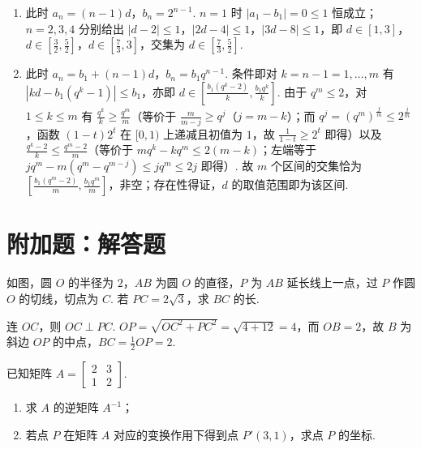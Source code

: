 \begin{solution}
\begin{enumerate}
\item 此时 \(a_n=(n-1)d\)，\(b_n=2^{n-1}\). \(n=1\) 时 \(|a_1-b_1|=0\leqslant1\) 恒成立；\(n=2,3,4\) 分别给出 \(|d-2|\leqslant1\)，\(|2d-4|\leqslant1\)，\(|3d-8|\leqslant1\)，即 \(d\in[1,3]\)，\(d\in\left[\frac32,\frac52\right]\)，\(d\in\left[\frac73,3\right]\)，交集为 \(d\in\left[\frac73,\frac52\right]\).
\item 此时 \(a_n=b_1+(n-1)d\)，\(b_n=b_1q^{n-1}\). 条件即对 \(k=n-1=1,\ldots,m\) 有 \(|kd-b_1(q^k-1)|\leqslant b_1\)，亦即 \(d\in\left[\frac{b_1(q^k-2)}{k},\frac{b_1q^k}{k}\right]\). 由于 \(q^m\leqslant2\)，对 \(1\leqslant k\leqslant m\) 有 \(\frac{q^k}{k}\geqslant\frac{q^m}{m}\)（等价于 \(\frac{m}{m-j}\geqslant q^j\)（\(j=m-k\)）；而 \(q^j=(q^m)^{\frac{j}{m}}\leqslant2^{\frac{j}{m}}\)，函数 \((1-t)2^t\) 在 \([0,1)\) 上递减且初值为 \(1\)，故 \(\frac1{1-t}\geqslant2^t\) 即得）以及 \(\frac{q^k-2}{k}\leqslant\frac{q^m-2}{m}\)（等价于 \(mq^k-kq^m\leqslant2(m-k)\)；左端等于 \(jq^m-m(q^m-q^{m-j})\leqslant jq^m\leqslant2j\) 即得）. 故 \(m\) 个区间的交集恰为 \(\left[\frac{b_1(q^m-2)}{m},\frac{b_1q^m}{m}\right]\)，非空；存在性得证，\(d\) 的取值范围即为该区间.
\end{enumerate}
\end{solution}

\section{附加题：解答题}

\begin{problem}[A]
如图，圆 \(O\) 的半径为 \(2\)，\(AB\) 为圆 \(O\) 的直径，\(P\) 为 \(AB\) 延长线上一点，过 \(P\) 作圆 \(O\) 的切线，切点为 \(C\). 若 \(PC=2\sqrt3\)，求 \(BC\) 的长.

\begin{center}
\end{center}
\end{problem}

\begin{solution}
连 \(OC\)，则 \(OC\perp PC\). \(OP=\sqrt{OC^2+PC^2}=\sqrt{4+12}=4\)，而 \(OB=2\)，故 \(B\) 为斜边 \(OP\) 的中点，\(BC=\frac12OP=2\).
\end{solution}

\reuseproblemnumber
\begin{problem}[B]
已知矩阵 \(A=\begin{bmatrix}2&3\\1&2\end{bmatrix}\).

\begin{enumerate}
\item 求 \(A\) 的逆矩阵 \(A^{-1}\)；
\item 若点 \(P\) 在矩阵 \(A\) 对应的变换作用下得到点 \(P'(3,1)\)，求点 \(P\) 的坐标.
\end{enumerate}
\end{problem}

